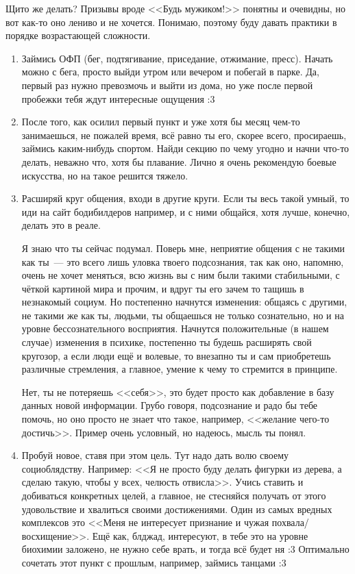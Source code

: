 \documentclass[a5paper,12pt,twoside]{memoir}
\begin{document}
Щито же делать? Призывы вроде <<Будь мужиком!>> понятны и очевидны, но вот как-то оно лениво и не хочется. Понимаю, поэтому буду давать практики в порядке возрастающей сложности.

\begin{enumerate}
\item Займись ОФП (бег, подтягивание, приседание, отжимание, пресс). Начать можно с бега, просто выйди утром или вечером и побегай в парке. Да, первый раз нужно превозмочь и выйти из дома, но уже после первой пробежки тебя ждут интересные ощущения :3
\item После того, как осилил первый пункт и уже хотя бы месяц чем-то занимаешься, не пожалей время, всё равно ты его, скорее всего, просираешь, займись каким-нибудь спортом. Найди секцию по чему угодно и начни что-то делать, неважно что, хотя бы плавание. Лично я очень рекомендую боевые искусства, но на такое решится тяжело.
\item Расширяй круг общения, входи в другие круги. Если ты весь такой умный, то иди на сайт бодибилдеров например, и с ними общайся, хотя лучше, конечно, делать это в реале.

Я знаю что ты сейчас подумал. Поверь мне, неприятие общения с не такими как ты~--- это всего лишь уловка твоего подсознания, так как оно, напомню, очень не хочет меняться, всю жизнь вы с ним были такими стабильными, с чёткой картиной мира и прочим, и вдруг ты его зачем то тащишь в незнакомый социум. Но постепенно начнутся изменения: общаясь с другими, не такими же как ты, людьми, ты общаешься не только сознательно, но и на уровне бессознательного восприятия. Начнутся положительные (в нашем случае) изменения в психике, постепенно ты будешь расширять свой кругозор, а если люди ещё и волевые, то внезапно ты и сам приобретешь различные стремления, а главное, умение к чему то стремится в принципе.

Нет, ты не потеряешь <<себя>>, это будет просто как добавление в базу данных новой информации. Грубо говоря, подсознание и радо бы тебе помочь, но оно просто не знает что такое, например, <<желание чего-то достичь>>. Пример очень условный, но надеюсь, мысль ты понял.
\item Пробуй новое, ставя при этом цель. Тут надо дать волю своему социоблядству. Например: <<Я не просто буду делать фигурки из дерева, а сделаю такую, чтобы у всех, челюсть отвисла>>. Учись ставить и добиваться конкретных целей, а главное, не стесняйся получать от этого удовольствие и хвалиться своими достижениями. Один из самых вредных комплексов это <<Меня не интересует признание и чужая похвала/восхищение>>. Ещё как, блджад, интересуют, в тебе это на уровне биохимии заложено, не нужно себе врать, и тогда всё будет ня :3 Оптимально сочетать этот пункт с прошлым, например, займись танцами :3


\end{enumerate}
\end{document}
